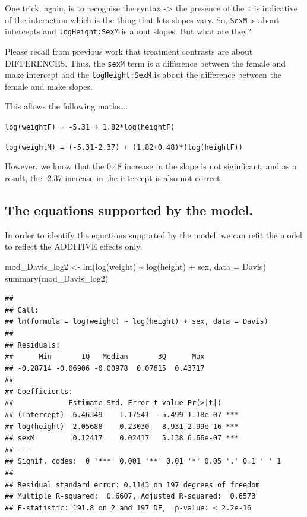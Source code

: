\documentclass[
]{book}
\newenvironment{Shaded}{\begin{snugshade}}{\end{snugshade}}
\newcommand{\AttributeTok}[1]{\textcolor[rgb]{0.77,0.63,0.00}{#1}}
\newcommand{\FunctionTok}[1]{\textcolor[rgb]{0.00,0.00,0.00}{#1}}
\newcommand{\NormalTok}[1]{#1}
\newcommand{\OtherTok}[1]{\textcolor[rgb]{0.56,0.35,0.01}{#1}}
\newcommand{\SpecialCharTok}[1]{\textcolor[rgb]{0.00,0.00,0.00}{#1}}
\begin{document}
One trick, again, is to recognise the syntax -\textgreater{} the presence of the \texttt{:} is indicative of the interaction which is the thing that lets slopes vary. So, \texttt{SexM} is about intercepts and \texttt{logHeight:SexM} is about slopes. But what are they?

Please recall from previous work that treatment contrasts are about DIFFERENCES. Thus, the \texttt{sexM} term is a difference between the female and make intercept and the \texttt{logHeight:SexM} is about the difference between the female and make slopes.

This allows the following maths\ldots.

\texttt{log(weightF)\ =\ -5.31\ +\ 1.82*log(heightF)}

\texttt{log(weightM)\ =\ (-5.31-2.37)\ +\ (1.82+0.48)*(log(heightF))}

However, we know that the 0.48 increase in the slope is not siginficant, and as a result, the -2.37 increase in the intercept is also not correct.

\hypertarget{the-equations-supported-by-the-model.}{%
\subsection{The equations supported by the model.}\label{the-equations-supported-by-the-model.}}

In order to identify the equations supported by the model, we can refit the model to reflect the ADDITIVE effects only.

\begin{Shaded}
\begin{Highlighting}[]
\NormalTok{mod\_Davis\_log2 }\OtherTok{\textless{}{-}} \FunctionTok{lm}\NormalTok{(}\FunctionTok{log}\NormalTok{(weight) }\SpecialCharTok{\textasciitilde{}} \FunctionTok{log}\NormalTok{(height) }\SpecialCharTok{+}\NormalTok{ sex, }\AttributeTok{data =}\NormalTok{ Davis)}
\FunctionTok{summary}\NormalTok{(mod\_Davis\_log2)}
\end{Highlighting}
\end{Shaded}

\begin{verbatim}
## 
## Call:
## lm(formula = log(weight) ~ log(height) + sex, data = Davis)
## 
## Residuals:
##      Min       1Q   Median       3Q      Max 
## -0.28714 -0.06906 -0.00978  0.07615  0.43717 
## 
## Coefficients:
##             Estimate Std. Error t value Pr(>|t|)    
## (Intercept) -6.46349    1.17541  -5.499 1.18e-07 ***
## log(height)  2.05688    0.23030   8.931 2.99e-16 ***
## sexM         0.12417    0.02417   5.138 6.66e-07 ***
## ---
## Signif. codes:  0 '***' 0.001 '**' 0.01 '*' 0.05 '.' 0.1 ' ' 1
## 
## Residual standard error: 0.1143 on 197 degrees of freedom
## Multiple R-squared:  0.6607, Adjusted R-squared:  0.6573 
## F-statistic: 191.8 on 2 and 197 DF,  p-value: < 2.2e-16
\end{verbatim}
\end{document}
